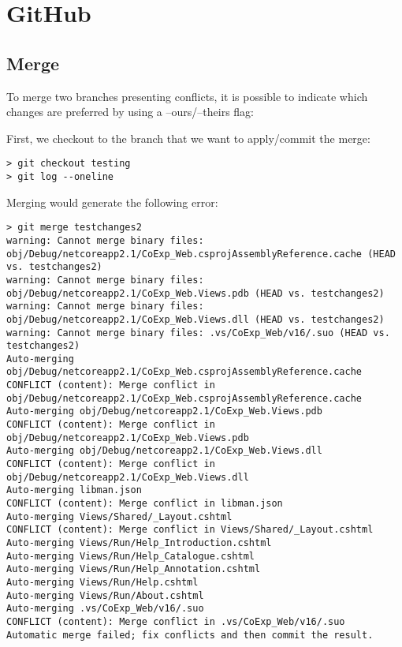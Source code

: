 \documentclass[]{book}
\begin{document}
\chapter{GitHub}\label{github}

\section{Merge}\label{merge}

To merge two branches presenting conflicts, it is possible to indicate
which changes are preferred by using a --ours/--theirs flag:

First, we checkout to the branch that we want to apply/commit the merge:

\begin{verbatim}
> git checkout testing
> git log --oneline
\end{verbatim}

Merging would generate the following error:

\begin{verbatim}
> git merge testchanges2
warning: Cannot merge binary files: obj/Debug/netcoreapp2.1/CoExp_Web.csprojAssemblyReference.cache (HEAD vs. testchanges2)
warning: Cannot merge binary files: obj/Debug/netcoreapp2.1/CoExp_Web.Views.pdb (HEAD vs. testchanges2)
warning: Cannot merge binary files: obj/Debug/netcoreapp2.1/CoExp_Web.Views.dll (HEAD vs. testchanges2)
warning: Cannot merge binary files: .vs/CoExp_Web/v16/.suo (HEAD vs. testchanges2)
Auto-merging obj/Debug/netcoreapp2.1/CoExp_Web.csprojAssemblyReference.cache
CONFLICT (content): Merge conflict in obj/Debug/netcoreapp2.1/CoExp_Web.csprojAssemblyReference.cache
Auto-merging obj/Debug/netcoreapp2.1/CoExp_Web.Views.pdb
CONFLICT (content): Merge conflict in obj/Debug/netcoreapp2.1/CoExp_Web.Views.pdb
Auto-merging obj/Debug/netcoreapp2.1/CoExp_Web.Views.dll
CONFLICT (content): Merge conflict in obj/Debug/netcoreapp2.1/CoExp_Web.Views.dll
Auto-merging libman.json
CONFLICT (content): Merge conflict in libman.json
Auto-merging Views/Shared/_Layout.cshtml
CONFLICT (content): Merge conflict in Views/Shared/_Layout.cshtml
Auto-merging Views/Run/Help_Introduction.cshtml
Auto-merging Views/Run/Help_Catalogue.cshtml
Auto-merging Views/Run/Help_Annotation.cshtml
Auto-merging Views/Run/Help.cshtml
Auto-merging Views/Run/About.cshtml
Auto-merging .vs/CoExp_Web/v16/.suo
CONFLICT (content): Merge conflict in .vs/CoExp_Web/v16/.suo
Automatic merge failed; fix conflicts and then commit the result.
\end{verbatim}
\end{document}
